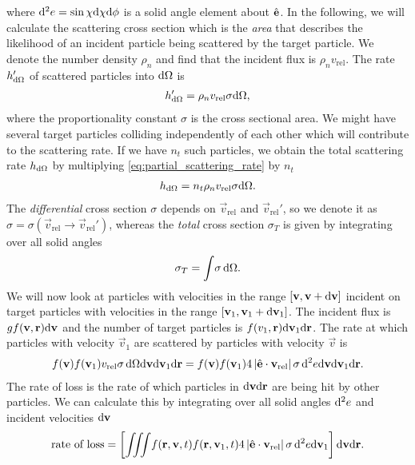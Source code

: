 where $\mathrm{d}^2e = \sin\chi \mathrm{d}\chi \mathrm{d}\phi$ is a solid angle element about $\hat {\mathbf{e}}$. In the following, we will calculate the scattering cross section which is the \textit{area} that describes the likelihood of an incident particle being scattered by the target particle. We denote the number density $\rho_n$ and find that the incident flux is $\rho_n v_\text{rel}$. The rate $h_{\mathrm{d}\Omega}'$ of scattered particles into $\mathrm{d}\Omega$ is
\begin{align}
	\label{eq:partial_scattering_rate}
	h_{\mathrm{d}\Omega}' = \rho_n v_\text{rel}\sigma \mathrm{d}\Omega,
\end{align}
where the proportionality constant $\sigma$ is the cross sectional area. We might have several target particles colliding independently of each other which will contribute to the scattering rate. If we have $n_t$ such particles, we obtain the total scattering rate $h_{\mathrm{d}\Omega}$ by multiplying \eqref{eq:partial_scattering_rate} by $n_t$
\begin{align}
	h_{\mathrm{d}\Omega} = n_t\rho_n v_\text{rel}\sigma \mathrm{d}\Omega.
\end{align}
The \textit{differential} cross section $\sigma$ depends on $\vec v_\text{rel}$ and $\vec v_\text{rel}'$, so we denote it as $\sigma = \sigma(\vec v_\text{rel}\rightarrow \vec v_\text{rel}')$, whereas the \textit{total} cross section $\sigma_T$ is given by integrating over all solid angles
\begin{align}
	\sigma_T = \int\! \sigma \, \mathrm{d}\Omega.
\end{align}
We will now look at particles with velocities in the range $[\mathbf v, \mathbf v + \mathrm{d}\mathbf v]$ incident on target particles with velocities in the range $[\mathbf v_1, \mathbf v_1 + \mathrm{d}\mathbf v_1]$. The incident flux is $gf(\mathbf v,\mathbf r)\mathrm{d}\mathbf v$ and the number of target particles is $f(v_1,\mathbf r)\mathrm{d}\mathbf v_1\mathrm{d}\mathbf r$. The rate at which particles with velocity $\vec v_1$ are scattered by particles with velocity $\vec v$ is 
\begin{align}
	f(\mathbf v)f(\mathbf v_1) v_\text{rel} \sigma \, \mathrm{d}\Omega \mathrm{d}\mathbf v \mathrm{d}\mathbf v_1 \mathrm{d}\mathbf r = f(\mathbf v)f(\mathbf v_1)4\left|\hat {\mathbf{e}}\cdot \mathbf v_\text{rel}\right| \sigma \,\mathrm{d}^2e \mathrm{d}\mathbf v \mathrm{d}\mathbf v_1 \mathrm{d}\mathbf r.
\end{align}
The rate of loss is the rate of which particles in $\mathrm{d}\mathbf v\mathrm{d}\mathbf r$ are being hit by other particles. We can calculate this by integrating over all solid angles $\mathrm{d}^2 e$ and incident velocities $\mathrm{d}\mathbf v$
\begin{align}
	\text{rate of loss} = \left[\iiint\! f(\mathbf r, \mathbf v, t)f(\mathbf r, \mathbf v_1, t)4\left|\hat {\mathbf{e}} \cdot \mathbf v_\text{rel} \right|\sigma \,\mathrm{d}^2 e\mathrm{d}\mathbf v_1\right]\mathrm{d}\mathbf v\mathrm{d}\mathbf r.
\end{align}
